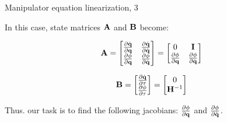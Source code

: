 \documentclass{beamer}
\begin{document}
\begin{frame}{Manipulator equation linearization, 3}
\begin{flushleft}

In this case, state matrices $\mathbf{A}$ and $\mathbf{B}$ become:


\begin{equation}
	\mathbf{A} = 
	\begin{bmatrix}
		\frac{\partial \dot{\mathbf{q}}}{\partial \mathbf{q}}  & 
		\frac{\partial \dot{\mathbf{q}}}{\partial \dot{\mathbf{q}}}
		 \\
		 \frac{\partial \phi}{\partial \mathbf{q}}  & 
		 \frac{\partial \phi}{\partial \dot{\mathbf{q}}}
	\end{bmatrix}
=
	\begin{bmatrix}
	0 & \mathbf{I}
	\\
	\frac{\partial \phi}{\partial \mathbf{q}}  & 
	\frac{\partial \phi}{\partial \dot{\mathbf{q}}}
\end{bmatrix}
\end{equation}


\begin{equation}
	\mathbf{B} = 
	\begin{bmatrix}
		\frac{\partial \dot{\mathbf{q}}}{\partial \tau} 
		\\
		\frac{\partial \phi}{\partial \tau} 
	\end{bmatrix}
	=
	\begin{bmatrix}
		0
		\\
		\mathbf{H}^{-1}
	\end{bmatrix}
\end{equation}

Thus. our task is to find the following jacobians: $\frac{\partial \phi}{\partial \mathbf{q}}$ and $\frac{\partial \phi}{\partial \dot{\mathbf{q}}}$.

\end{flushleft}
\end{frame}
\end{document}
